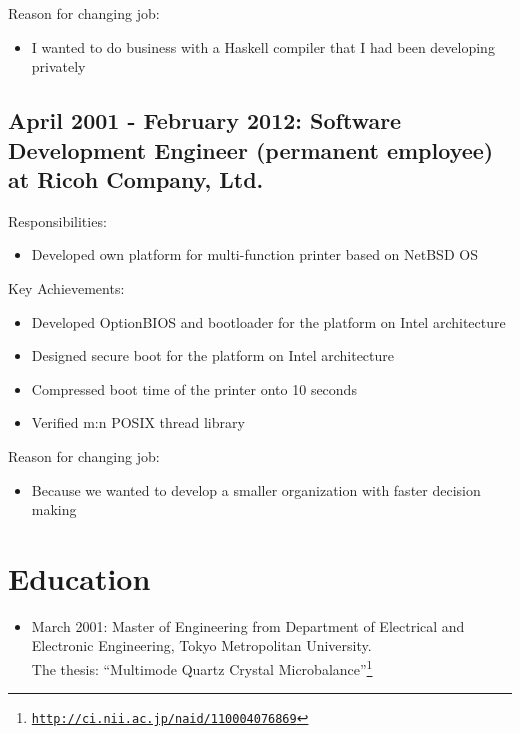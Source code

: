 \documentclass[letterpaper]{article}
\begin{document}
\noindent Reason for changing job:

\begin{itemize}
  \item I wanted to do business with a Haskell compiler that I had been developing privately
\end{itemize}

\subsection*{April 2001 - February 2012: Software Development Engineer (permanent employee) at Ricoh Company, Ltd.}

\noindent Responsibilities:

\begin{itemize}
  \item Developed own platform for multi-function printer based on NetBSD OS
\end{itemize}

\noindent Key Achievements:

\begin{itemize}
  \item Developed OptionBIOS and bootloader for the platform on Intel architecture
  \item Designed secure boot for the platform on Intel architecture
  \item Compressed boot time of the printer onto 10 seconds
  \item Verified m:n POSIX thread library
\end{itemize}

\noindent Reason for changing job:

\begin{itemize}
  \item Because we wanted to develop a smaller organization with faster decision making
\end{itemize}

\section*{Education}

\begin{itemize}
  \item March 2001: Master of Engineering from Department of Electrical and Electronic Engineering, Tokyo Metropolitan University. \\
    The thesis: ``Multimode Quartz Crystal Microbalance''\footnote{\href{http://ci.nii.ac.jp/naid/110004076869}{\tt http://ci.nii.ac.jp/naid/110004076869}}
\end{itemize}
\end{document}

